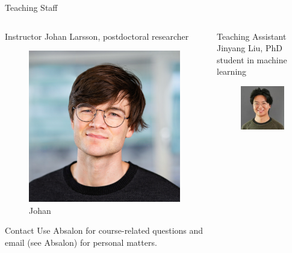 \documentclass[
  ignorenonframetext,
  aspectratio=1610,
  onlytextwidth]{beamer}
\begin{document}
\begin{frame}{Teaching Staff}
\label{teaching-staff}
\begin{columns}[T]
\begin{column}{0.47\linewidth}
\begin{block}{Instructor}
\label{instructor}
Johan Larsson, postdoctoral researcher

\begin{figure}[H]

{\centering \includegraphics[width=0.5\linewidth,height=\textheight,keepaspectratio]{../images/johan.jpg}

}

\caption{Johan}

\end{figure}%

\begin{block}{Contact}
\label{contact}
Use Absalon for course-related questions and email (see Absalon) for
personal matters.
\end{block}
\end{block}
\end{column}

\pause

\begin{column}{0.47\linewidth}
\begin{block}{Teaching Assistant}
\label{teaching-assistant}
Jinyang Liu, PhD student in machine learning

\begin{figure}[H]

{\centering \includegraphics[width=0.5\linewidth,height=\textheight,keepaspectratio]{../images/jinyang.jpg}

}
\end{figure}
\end{block}
\end{column}
\end{columns}
\end{frame}
\end{document}
